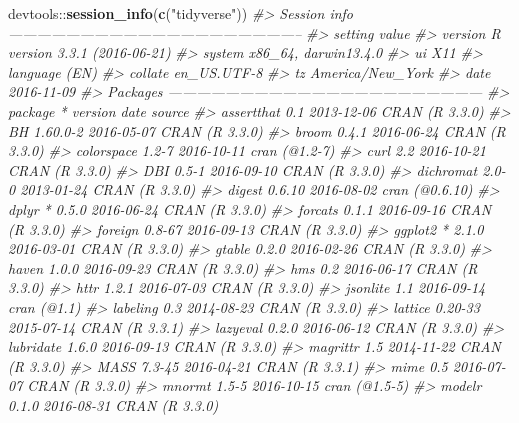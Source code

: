 \documentclass[]{book}
\newenvironment{Shaded}{\begin{snugshade}}{\end{snugshade}}
\newcommand{\KeywordTok}[1]{\textcolor[rgb]{0.13,0.29,0.53}{\textbf{{#1}}}}
\newcommand{\StringTok}[1]{\textcolor[rgb]{0.31,0.60,0.02}{{#1}}}
\newcommand{\CommentTok}[1]{\textcolor[rgb]{0.56,0.35,0.01}{\textit{{#1}}}}
\newcommand{\NormalTok}[1]{{#1}}
\begin{document}
\begin{Shaded}
\begin{Highlighting}[]
\NormalTok{devtools::}\KeywordTok{session_info}\NormalTok{(}\KeywordTok{c}\NormalTok{(}\StringTok{"tidyverse"}\NormalTok{))}
\CommentTok{#> Session info --------------------------------------------------------------}
\CommentTok{#>  setting  value                       }
\CommentTok{#>  version  R version 3.3.1 (2016-06-21)}
\CommentTok{#>  system   x86_64, darwin13.4.0        }
\CommentTok{#>  ui       X11                         }
\CommentTok{#>  language (EN)                        }
\CommentTok{#>  collate  en_US.UTF-8                 }
\CommentTok{#>  tz       America/New_York            }
\CommentTok{#>  date     2016-11-09}
\CommentTok{#> Packages ------------------------------------------------------------------}
\CommentTok{#>  package      * version  date       source        }
\CommentTok{#>  assertthat     0.1      2013-12-06 CRAN (R 3.3.0)}
\CommentTok{#>  BH             1.60.0-2 2016-05-07 CRAN (R 3.3.0)}
\CommentTok{#>  broom          0.4.1    2016-06-24 CRAN (R 3.3.0)}
\CommentTok{#>  colorspace     1.2-7    2016-10-11 cran (@1.2-7) }
\CommentTok{#>  curl           2.2      2016-10-21 CRAN (R 3.3.0)}
\CommentTok{#>  DBI            0.5-1    2016-09-10 CRAN (R 3.3.0)}
\CommentTok{#>  dichromat      2.0-0    2013-01-24 CRAN (R 3.3.0)}
\CommentTok{#>  digest         0.6.10   2016-08-02 cran (@0.6.10)}
\CommentTok{#>  dplyr        * 0.5.0    2016-06-24 CRAN (R 3.3.0)}
\CommentTok{#>  forcats        0.1.1    2016-09-16 CRAN (R 3.3.0)}
\CommentTok{#>  foreign        0.8-67   2016-09-13 CRAN (R 3.3.0)}
\CommentTok{#>  ggplot2      * 2.1.0    2016-03-01 CRAN (R 3.3.0)}
\CommentTok{#>  gtable         0.2.0    2016-02-26 CRAN (R 3.3.0)}
\CommentTok{#>  haven          1.0.0    2016-09-23 CRAN (R 3.3.0)}
\CommentTok{#>  hms            0.2      2016-06-17 CRAN (R 3.3.0)}
\CommentTok{#>  httr           1.2.1    2016-07-03 CRAN (R 3.3.0)}
\CommentTok{#>  jsonlite       1.1      2016-09-14 cran (@1.1)   }
\CommentTok{#>  labeling       0.3      2014-08-23 CRAN (R 3.3.0)}
\CommentTok{#>  lattice        0.20-33  2015-07-14 CRAN (R 3.3.1)}
\CommentTok{#>  lazyeval       0.2.0    2016-06-12 CRAN (R 3.3.0)}
\CommentTok{#>  lubridate      1.6.0    2016-09-13 CRAN (R 3.3.0)}
\CommentTok{#>  magrittr       1.5      2014-11-22 CRAN (R 3.3.0)}
\CommentTok{#>  MASS           7.3-45   2016-04-21 CRAN (R 3.3.1)}
\CommentTok{#>  mime           0.5      2016-07-07 CRAN (R 3.3.0)}
\CommentTok{#>  mnormt         1.5-5    2016-10-15 cran (@1.5-5) }
\CommentTok{#>  modelr         0.1.0    2016-08-31 CRAN (R 3.3.0)}

\end{Highlighting}
\end{Shaded}
\end{document}
